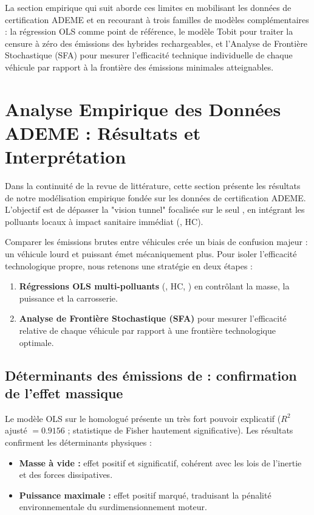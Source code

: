 \documentclass[12pt, a4paper]{article}
\begin{document}
La section empirique qui suit aborde ces limites en mobilisant les données de certification ADEME et en recourant à trois familles de modèles complémentaires : la régression OLS comme point de référence, le modèle Tobit pour traiter la censure à zéro des émissions des hybrides rechargeables, et l'Analyse de Frontière Stochastique (SFA) pour mesurer l'efficacité technique individuelle de chaque véhicule par rapport à la frontière des émissions minimales atteignables.



\iffalse

\section{Analyse Empirique des Données ADEME : Résultats et Interprétation}

Dans la continuité de la revue de littérature, cette section présente les résultats de notre modélisation empirique fondée sur les données de certification ADEME. L'objectif est de dépasser la "vision tunnel" focalisée sur le seul , en intégrant les polluants locaux à impact sanitaire immédiat (, HC).

Comparer les émissions brutes entre véhicules crée un biais de confusion majeur : un véhicule lourd et puissant émet mécaniquement plus. Pour isoler l'efficacité technologique propre, nous retenons une stratégie en deux étapes :
\begin{enumerate}
    \item \textbf{Régressions OLS multi-polluants} (, HC, ) en contrôlant la masse, la puissance et la carrosserie.
    \item \textbf{Analyse de Frontière Stochastique (SFA)} pour mesurer l'efficacité relative de chaque véhicule par rapport à une frontière technologique optimale.
\end{enumerate}

\subsection{Déterminants des émissions de \texorpdfstring{}{CO2} : confirmation de l'effet massique}

Le modèle OLS sur le  homologué présente un très fort pouvoir explicatif ($R^2$ ajusté $= 0.9156$ ; statistique de Fisher hautement significative). Les résultats confirment les déterminants physiques :
\begin{itemize}
    \item \textbf{Masse à vide :} effet positif et significatif, cohérent avec les lois de l'inertie et des forces dissipatives.
    \item \textbf{Puissance maximale :} effet positif marqué, traduisant la pénalité environnementale du surdimensionnement moteur.
\end{itemize}
\end{document}
